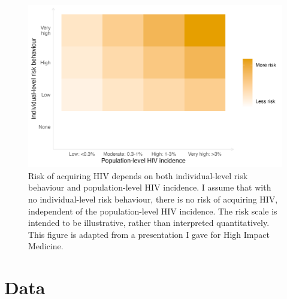 \documentclass[a4paper, nobind]{templates/ociamthesis}
\begin{document}
\begin{figure}

{\centering \includegraphics[width=0.95\linewidth]{figures/multi-agyw/risk-grid} 

}

\caption{Risk of acquiring HIV depends on both individual-level risk behaviour and population-level HIV incidence. I assume that with no individual-level risk behaviour, there is no risk of acquiring HIV, independent of the population-level HIV incidence. The risk scale is intended to be illustrative, rather than interpreted quantitatively. This figure is adapted from a presentation I gave for High Impact Medicine.}\label{fig:risk-grid}
\end{figure}

\hypertarget{data-1}{%
\section{Data}\label{data-1}}
\end{document}

